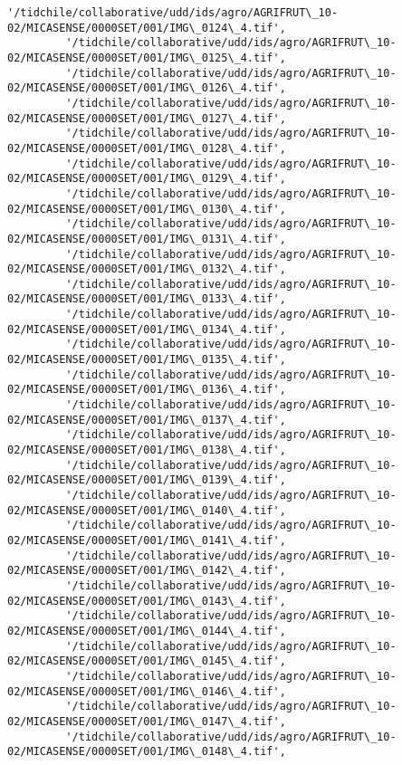 \documentclass[11pt]{article}
\begin{document}
\begin{Verbatim}[commandchars=\\\{\}]
         '/tidchile/collaborative/udd/ids/agro/AGRIFRUT\_10-02/MICASENSE/0000SET/001/IMG\_0124\_4.tif',
         '/tidchile/collaborative/udd/ids/agro/AGRIFRUT\_10-02/MICASENSE/0000SET/001/IMG\_0125\_4.tif',
         '/tidchile/collaborative/udd/ids/agro/AGRIFRUT\_10-02/MICASENSE/0000SET/001/IMG\_0126\_4.tif',
         '/tidchile/collaborative/udd/ids/agro/AGRIFRUT\_10-02/MICASENSE/0000SET/001/IMG\_0127\_4.tif',
         '/tidchile/collaborative/udd/ids/agro/AGRIFRUT\_10-02/MICASENSE/0000SET/001/IMG\_0128\_4.tif',
         '/tidchile/collaborative/udd/ids/agro/AGRIFRUT\_10-02/MICASENSE/0000SET/001/IMG\_0129\_4.tif',
         '/tidchile/collaborative/udd/ids/agro/AGRIFRUT\_10-02/MICASENSE/0000SET/001/IMG\_0130\_4.tif',
         '/tidchile/collaborative/udd/ids/agro/AGRIFRUT\_10-02/MICASENSE/0000SET/001/IMG\_0131\_4.tif',
         '/tidchile/collaborative/udd/ids/agro/AGRIFRUT\_10-02/MICASENSE/0000SET/001/IMG\_0132\_4.tif',
         '/tidchile/collaborative/udd/ids/agro/AGRIFRUT\_10-02/MICASENSE/0000SET/001/IMG\_0133\_4.tif',
         '/tidchile/collaborative/udd/ids/agro/AGRIFRUT\_10-02/MICASENSE/0000SET/001/IMG\_0134\_4.tif',
         '/tidchile/collaborative/udd/ids/agro/AGRIFRUT\_10-02/MICASENSE/0000SET/001/IMG\_0135\_4.tif',
         '/tidchile/collaborative/udd/ids/agro/AGRIFRUT\_10-02/MICASENSE/0000SET/001/IMG\_0136\_4.tif',
         '/tidchile/collaborative/udd/ids/agro/AGRIFRUT\_10-02/MICASENSE/0000SET/001/IMG\_0137\_4.tif',
         '/tidchile/collaborative/udd/ids/agro/AGRIFRUT\_10-02/MICASENSE/0000SET/001/IMG\_0138\_4.tif',
         '/tidchile/collaborative/udd/ids/agro/AGRIFRUT\_10-02/MICASENSE/0000SET/001/IMG\_0139\_4.tif',
         '/tidchile/collaborative/udd/ids/agro/AGRIFRUT\_10-02/MICASENSE/0000SET/001/IMG\_0140\_4.tif',
         '/tidchile/collaborative/udd/ids/agro/AGRIFRUT\_10-02/MICASENSE/0000SET/001/IMG\_0141\_4.tif',
         '/tidchile/collaborative/udd/ids/agro/AGRIFRUT\_10-02/MICASENSE/0000SET/001/IMG\_0142\_4.tif',
         '/tidchile/collaborative/udd/ids/agro/AGRIFRUT\_10-02/MICASENSE/0000SET/001/IMG\_0143\_4.tif',
         '/tidchile/collaborative/udd/ids/agro/AGRIFRUT\_10-02/MICASENSE/0000SET/001/IMG\_0144\_4.tif',
         '/tidchile/collaborative/udd/ids/agro/AGRIFRUT\_10-02/MICASENSE/0000SET/001/IMG\_0145\_4.tif',
         '/tidchile/collaborative/udd/ids/agro/AGRIFRUT\_10-02/MICASENSE/0000SET/001/IMG\_0146\_4.tif',
         '/tidchile/collaborative/udd/ids/agro/AGRIFRUT\_10-02/MICASENSE/0000SET/001/IMG\_0147\_4.tif',
         '/tidchile/collaborative/udd/ids/agro/AGRIFRUT\_10-02/MICASENSE/0000SET/001/IMG\_0148\_4.tif',

\end{Verbatim}
\end{document}
